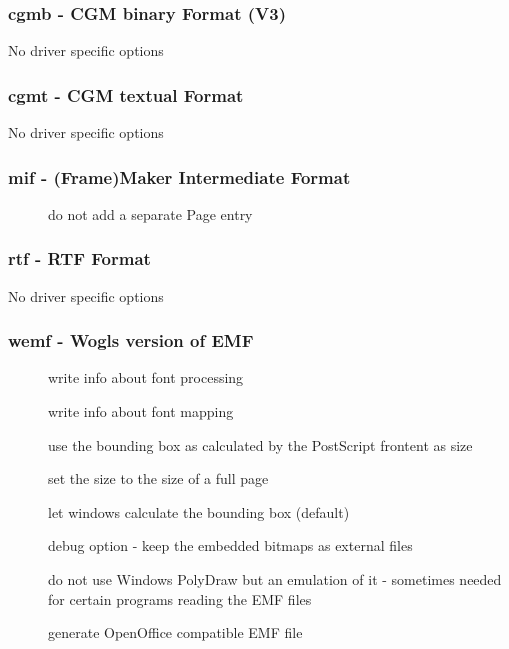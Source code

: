 \documentclass[english,a4paper]{article}
\begin{document}
\subsubsection{cgmb - CGM binary Format (V3)}
No driver specific options
\subsubsection{cgmt - CGM textual Format}
No driver specific options
\subsubsection{mif - (Frame)Maker Intermediate Format}
\begin{description}
\item[] 
do not add a separate Page entry


\end{description}
\subsubsection{rtf - RTF Format}
No driver specific options
\subsubsection{wemf - Wogls version of EMF }
\begin{description}
\item[] 
write info about font processing


\item[] 
write info about font mapping


\item[] 
use the bounding box as calculated by the PostScript frontent as size


\item[] 
set the size to the size of a full page


\item[] 
let windows calculate the bounding box (default)


\item[] 
debug option - keep the embedded bitmaps as external files 


\item[] 
do not use Windows PolyDraw but an emulation of it - sometimes needed for certain programs reading the EMF files


\item[] 
generate OpenOffice compatible EMF file


\end{description}
\end{document}
